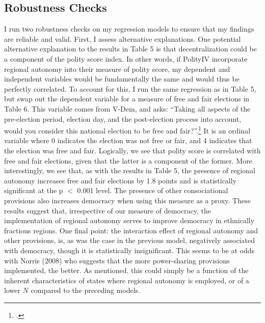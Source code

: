 \documentclass[12pt]{article}
\begin{document}
\subsection{Robustness Checks}
I run two robustness checks on my regression models to ensure that my findings are reliable and valid. First, I assess alternative explanations. One potential alternative explanation to the results in Table 5 is that decentralization could be a component of the polity score index. In other words, if PolityIV incorporate regional autonomy into their measure of polity score, my dependent and independent variables would be fundamentally the same and would thus be perfectly correlated. To account for this, I run the same regression as in Table 5, but swap out the dependent variable for a measure of free and fair elections in Table 6. This variable comes from V-Dem, and asks: ``Taking all aspects of the pre-election period, election day, and the post-election process into account, would you consider this national election to be free and fair?''.\footcite{coppedge_v-dem_nodate} It is an ordinal variable where 0 indicates the election was not free or fair, and 4 indicates that the election was free and fair. Logically, we see that polity score is correlated with free and fair elections, given that the latter is a component of the former. More interestingly, we see that, as with the results in Table 5, the presence of regional autonomy increases free and fair elections by 1.8 points and is statistically significant at the p $<$ 0.001 level. The presence of other consociational provisions also increases democracy when using this measure as a proxy. These results suggest that, irrespective of our measure of democracy, the implementation of regional autonomy serves to improve democracy in ethnically fractious regions. One final point: the interaction effect of regional autonomy and other provisions, is, as was the case in the previous model, negatively associated with democracy, though it is statistically insignificant. This seems to be at odds with Norris (2008) who suggests that the more power-sharing provisions implemented, the better. As mentioned, this could simply be a function of the inherent characteristics of states where regional autonomy is employed, or of a lower $N$ compared to the preceding models.  
\end{document}
